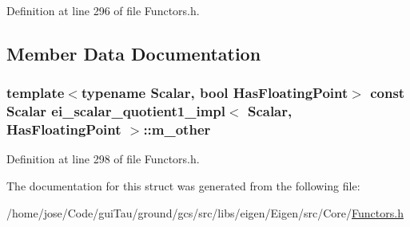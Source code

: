 Definition at line 296 of file Functors.\-h.



\subsection{Member Data Documentation}
\hypertarget{structei__scalar__quotient1__impl_ae328ebe6f6bb2975a481f0a2728fb8e7}{
\subsubsection[{m\-\_\-other}]{\setlength{\rightskip}{0pt plus 5cm}template$<$typename Scalar, bool Has\-Floating\-Point$>$ const Scalar {\bf ei\-\_\-scalar\-\_\-quotient1\-\_\-impl}$<$ Scalar, Has\-Floating\-Point $>$\-::m\-\_\-other}}\label{structei__scalar__quotient1__impl_ae328ebe6f6bb2975a481f0a2728fb8e7}


Definition at line 298 of file Functors.\-h.



The documentation for this struct was generated from the following file\-:\begin{DoxyCompactItemize}
\item 
/home/jose/\-Code/gui\-Tau/ground/gcs/src/libs/eigen/\-Eigen/src/\-Core/\hyperlink{_core_2_functors_8h}{Functors.\-h}\end{DoxyCompactItemize}
